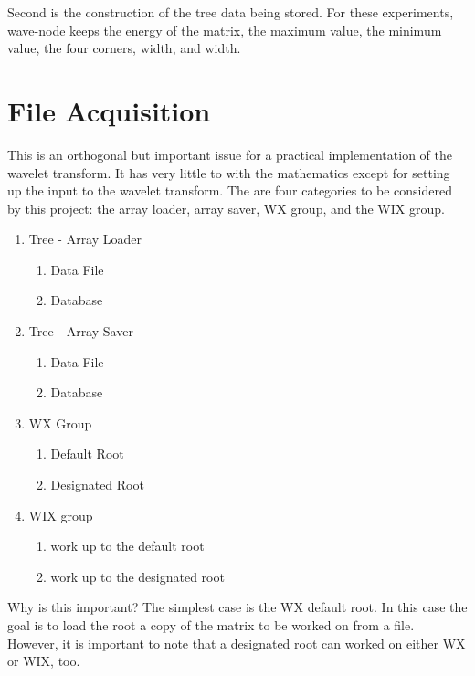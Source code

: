 \documentclass[11pt]{article}
\begin{document}
 Second is the construction of the tree data being stored.  For these experiments, wave-node keeps the energy of the matrix, the maximum value, the minimum value, the four corners, width, and width.

\section {File Acquisition}
This is an orthogonal but important issue for a practical implementation of the wavelet transform.   It has very little to with the mathematics except for setting up the input to the wavelet transform.   The are four categories to be considered by this project: the array loader, array saver, WX group, and the WIX group.

\begin{enumerate}
\item Tree - Array Loader
\begin{enumerate}
\item Data File
\item Database
\end{enumerate}
\item Tree - Array Saver
\begin{enumerate}
\item Data File
\item Database
\end{enumerate}
\item WX Group
\begin{enumerate}
\item Default Root
\item Designated Root
\end{enumerate}
\item WIX group
\begin{enumerate}

\item work up to the default root
\item work up to the designated root
\end{enumerate}

\end{enumerate}

Why is this important?  The simplest case is the WX default root.  In this case the goal is to load the root a copy of the matrix to be worked on from a file.   However, it is important to note that a designated root can  worked on either WX or WIX, too.  
\end{document}
